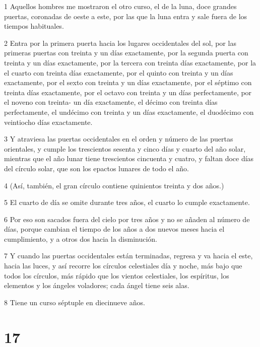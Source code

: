 \par 1 Aquellos hombres me mostraron el otro curso, el de la luna, doce grandes puertas, coronadas de oeste a este, por las que la luna entra y sale fuera de los tiempos habituales.

\par 2 Entra por la primera puerta hacia los lugares occidentales del sol, por las primeras puertas con treinta y un días exactamente, por la segunda puerta con treinta y un días exactamente, por la tercera con treinta días exactamente, por la el cuarto con treinta días exactamente, por el quinto con treinta y un días exactamente, por el sexto con treinta y un días exactamente, por el séptimo con treinta días exactamente, por el octavo con treinta y un días perfectamente, por el noveno con treinta- un día exactamente, el décimo con treinta días perfectamente, el undécimo con treinta y un días exactamente, el duodécimo con veintiocho días exactamente.

\par 3 Y atraviesa las puertas occidentales en el orden y número de las puertas orientales, y cumple los trescientos sesenta y cinco días y cuarto del año solar, mientras que el año lunar tiene trescientos cincuenta y cuatro, y faltan doce días del círculo solar, que son los epactos lunares de todo el año.

\par 4 (Así, también, el gran círculo contiene quinientos treinta y dos años.)

\par 5 El cuarto de día se omite durante tres años, el cuarto lo cumple exactamente.

\par 6 Por eso son sacados fuera del cielo por tres años y no se añaden al número de días, porque cambian el tiempo de los años a dos nuevos meses hacia el cumplimiento, y a otros dos hacia la disminución.

\par 7 Y cuando las puertas occidentales están terminadas, regresa y va hacia el este, hacia las luces, y así recorre los círculos celestiales día y noche, más bajo que todos los círculos, más rápido que los vientos celestiales, los espíritus, los elementos y los ángeles voladores; cada ángel tiene seis alas.

\par 8 Tiene un curso séptuple en diecinueve años.

\chapter{17}

